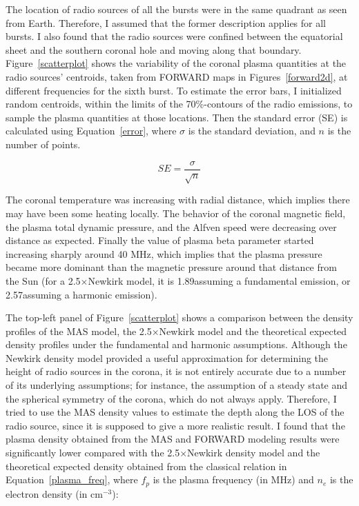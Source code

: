 The location of radio sources of all the bursts were in the same quadrant as seen from Earth. Therefore, I assumed that the former description applies for all bursts.
I also found that the radio sources were confined between the equatorial sheet and the southern coronal hole and moving along that boundary.
Figure~\ref{scatterplot} shows the variability of the coronal plasma quantities at the radio sources' centroids, taken from FORWARD maps in Figures~\ref{forward2d}, at different frequencies for the sixth burst.
To estimate the error bars, I initialized random centroids, within the limits of the 70\%-contours of the radio emissions, to sample the plasma quantities at those locations. Then the standard error (SE) is calculated using Equation~\ref{error}, where $\sigma$ is the standard deviation, and $n$ is the number of points.

\begin{equation}
    SE = \frac{\sigma}{\sqrt{n}}
\label{error}
\end{equation}

The coronal temperature was increasing with radial distance, which implies there may have been some heating locally.
The behavior of the coronal magnetic field, the plasma total dynamic pressure, and the Alfven speed were decreasing over distance as expected.
Finally the value of plasma beta parameter started increasing sharply around 40 MHz, which implies that the plasma pressure became more dominant than the magnetic pressure around that distance from the Sun (for a 2.5$\times$Newkirk model, it is 1.89\rsun assuming a fundamental emission, or 2.57\rsun assuming a harmonic emission).

The top-left panel of Figure~\ref{scatterplot} shows a comparison between the density profiles of the MAS model, the 2.5$\times$Newkirk model and the theoretical expected density profiles under the fundamental and harmonic assumptions.
Although the Newkirk density model provided a useful approximation for determining the height of radio sources in the corona, it is not entirely accurate due to a number of its underlying assumptions; for instance, the assumption of a steady state and the spherical symmetry of the corona, which do not always apply. Therefore, I tried to use the MAS density values to estimate the depth along the LOS of the radio source, since it is supposed to give a more realistic result.
I found that the plasma density obtained from the MAS and FORWARD modeling results were significantly lower compared with the 2.5$\times$Newkirk density model and the theoretical expected density obtained from the classical relation in Equation~\ref{plasma_freq}, where $f_p$ is the plasma frequency (in MHz) and $n_e$ is the electron density (in cm$^{-3}$):

